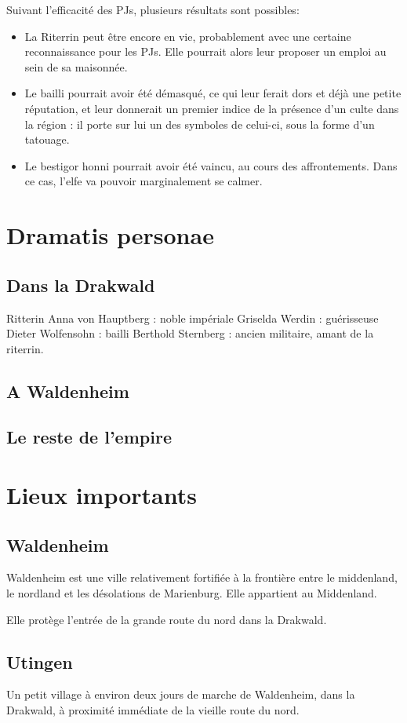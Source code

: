\documentclass[10pt,a4paper]{book}
\begin{document}
Suivant l'efficacité des PJs, plusieurs résultats sont possibles:
\begin{itemize}
\item La Riterrin peut être encore en vie, probablement avec une certaine reconnaissance pour les PJs. Elle pourrait alors leur proposer un emploi au sein de sa maisonnée.
\item Le bailli pourrait avoir été démasqué, ce qui leur ferait dors et déjà une petite réputation, et leur donnerait un premier indice de la présence d'un culte dans la région : il porte sur lui un des symboles de celui-ci, sous la forme d'un tatouage.
\item Le bestigor honni pourrait avoir été vaincu, au cours des affrontements. Dans ce cas, l'elfe va pouvoir marginalement se calmer.
\end{itemize}
\chapter{Dramatis personae}
\section{Dans la Drakwald}
Ritterin Anna von Hauptberg : noble impériale
Griselda Werdin : guérisseuse
Dieter Wolfensohn : bailli
Berthold Sternberg : ancien militaire, amant de la riterrin.
\section{A Waldenheim}
\section{Le reste de l'empire}

\chapter{Lieux importants}
\section{Waldenheim}
Waldenheim est une ville relativement fortifiée à la frontière entre le middenland, le nordland et les désolations de Marienburg. Elle appartient au Middenland.

Elle protège l'entrée de la grande route du nord dans la Drakwald.
\section{Utingen}
Un petit village à environ deux jours de marche de Waldenheim, dans la Drakwald, à proximité immédiate de la vieille route du nord. 
\end{document}
